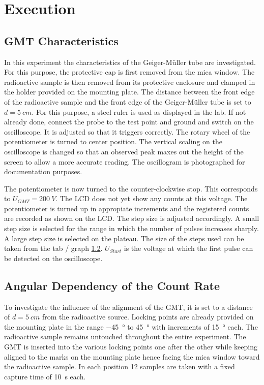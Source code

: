 \chapter{Execution}
\section{GMT Characteristics}
In this experiment the characteristics of the Geiger-Müller tube are investigated. For this purpose, the protective cap
is first removed from the mica window. The radioactive sample is then removed from its protective enclosure and clamped
in the holder provided on the mounting plate. The distance between the front edge of the radioactive sample and the front edge
of the Geiger-Müller tube is set to \(d = \SI[]{5}[]{cm}\). For this purpose, a steel ruler is used as displayed in the
lab. If not already done, connect the probe to the test point and ground and switch on the oscilloscope. It is
adjusted so that it triggers correctly. The rotary wheel of the potentiometer is turned to center position. The vertical
scaling on the oscilloscope is changed so that an observed peak maxes out the height of the screen to allow a more
accurate reading. The oscillogram is photographed for documentation purposes.\par
The potentiometer is now turned to the counter-clockwise stop. This corresponds to \(U_{GMT} = \SI[]{200}[]{V}\). The LCD
does not yet show any counts at this voltage. The potentiometer is turned up in appropiate increments and the registered
counts are recorded as shown on the LCD. The step size is adjusted accordingly. A small step size is selected for the
range in which the number of pulses increases sharply. A large step size is selected on the plateau. The size of the
steps used can be taken from the tab / graph \ref{}. $U_{Start}$ is the voltage at which the first pulse can be detected %
on the oscilloscope.
%
\section{Angular Dependency of the Count Rate}
To investigate the influence of the alignment of the GMT, it is set to a distance of \(d = \SI{5}{cm}\) from the
radioactive source. Locking points are already provided on the mounting plate in the range \SI[]{-45}[]{\degree} to
\SI[]{+45}[]{\degree} with increments of \SI[]{15}[]{\degree} each. The radioactive sample remains untouched throughout
the entire experiment. The GMT is inserted into the various locking points one after the other while keeping aligned to
the marks on the mounting plate hence facing the mica window toward the radioactive sample. In each position 12 samples
are taken with a fixed capture time of \SI[]{10}[]{s} each.
%
